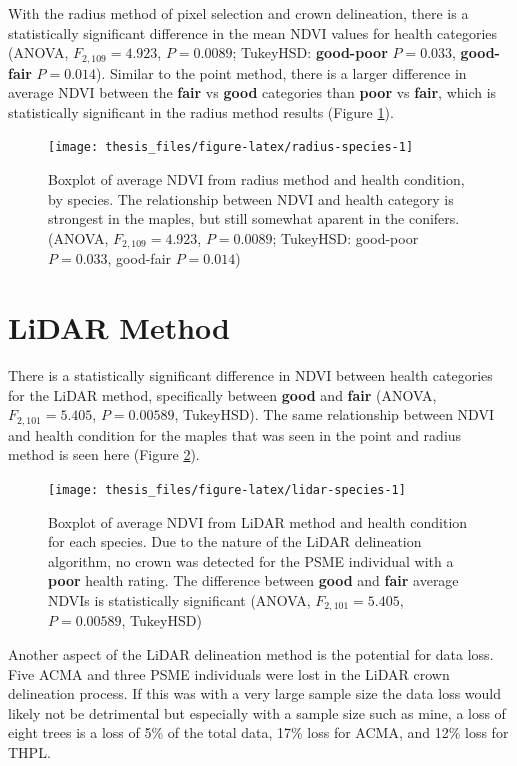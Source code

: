 \documentclass[12pt,twoside]{reedthesis}
\begin{document}
With the radius method of pixel selection and crown delineation, there is a statistically significant difference in the mean NDVI values for health categories (ANOVA, \(F_{2,109}=4.923\), \(P = 0.0089\); TukeyHSD: \textbf{good-poor} \(P = 0.033\), \textbf{good-fair} \(P = 0.014\)). Similar to the point method, there is a larger difference in average NDVI between the \textbf{fair} vs \textbf{good} categories than \textbf{poor} vs \textbf{fair}, which is statistically significant in the radius method results (Figure \ref{fig:radius-species}).
\begin{figure}

{\centering \texttt{[image: thesis\_files/figure-latex/radius-species-1]} 

}

\caption[Radius method mean NDVI and health condition by species]{Boxplot of average NDVI from radius method and health condition, by species. The relationship between NDVI and health category is strongest in the maples, but still somewhat aparent in the conifers. (ANOVA, $F_{2,109}=4.923$, $P = 0.0089$; TukeyHSD: good-poor $P = 0.033$, good-fair $P = 0.014$)}\label{fig:radius-species}
\end{figure}
\hypertarget{lidar-method-1}{%
\section{LiDAR Method}\label{lidar-method-1}}

There is a statistically significant difference in NDVI between health categories for the LiDAR method, specifically between \textbf{good} and \textbf{fair} (ANOVA, \(F_{2,101} = 5.405\), \(P = 0.00589\), TukeyHSD). The same relationship between NDVI and health condition for the maples that was seen in the point and radius method is seen here (Figure \ref{fig:lidar-species}).


\begin{figure}

{\centering \texttt{[image: thesis\_files/figure-latex/lidar-species-1]} 

}

\caption[NDVI and health condition for LiDAR method]{Boxplot of average NDVI from LiDAR method and health condition for each species. Due to the nature of the LiDAR delineation algorithm, no crown was detected for the PSME individual with a \textbf{poor} health rating. The difference between \textbf{good} and \textbf{fair} average NDVIs is statistically significant (ANOVA, \(F_{2,101} = 5.405\), \(P = 0.00589\), TukeyHSD)}\label{fig:lidar-species}
\end{figure}
Another aspect of the LiDAR delineation method is the potential for data loss. Five ACMA and three PSME individuals were lost in the LiDAR crown delineation process. If this was with a very large sample size the data loss would likely not be detrimental but especially with a sample size such as mine, a loss of eight trees is a loss of 5\% of the total data, 17\% loss for ACMA, and 12\% loss for THPL.
\end{document}
